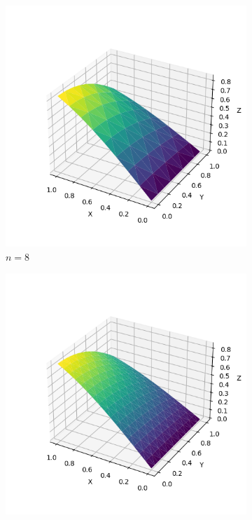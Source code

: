\documentclass[lang=cn,a4paper,newtx,bibend=bibtex]{elegantpaper}
\begin{document}
\begin{figure}[H]
  \centering
  \begin{subfigure}[b]{0.18\textwidth}
      \includegraphics[width=\textwidth]{../../res_bac/res-[data|2-Dirichlet-regular-a8].png}
      \caption{$n =  8$}
  \end{subfigure}
  \hfill
  \begin{subfigure}[b]{0.18\textwidth}
      \includegraphics[width=\textwidth]{../../res_bac/res-[data|2-Dirichlet-regular-b16].png}

\end{subfigure}
\end{figure}
\end{document}
